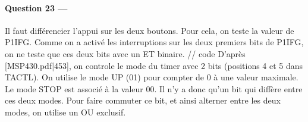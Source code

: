 \documentclass[a4paper,11pt,article]{memoir}
\begin{document}
\paragraph{Question 23 ---}  Il faut différencier l'appui sur les deux boutons. Pour cela, on teste la valeur de P1IFG. Comme on a activé les interruptions sur les deux premiers bits de P1IFG, on ne teste que ces deux bits avec un ET binaire.
// code
D'après [MSP430.pdf|453], on controle le mode du timer avec 2 bits (positions 4 et 5 dans TACTL). On utilise le mode UP (01)  pour compter de 0 à une valeur maximale. Le mode STOP est associé à la valeur 00. Il n'y a donc qu'un bit qui diffère entre ces deux modes. Pour faire commuter ce bit, et ainsi alterner entre les deux modes, on utilise un OU exclusif.
\end{document}
